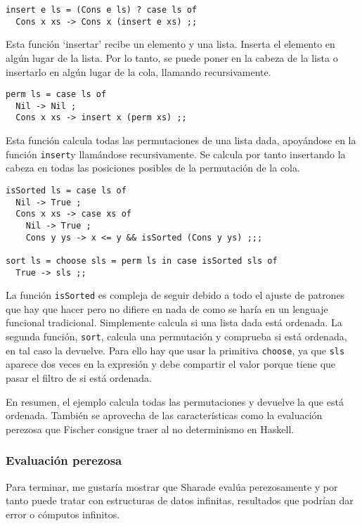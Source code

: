 \documentclass[class=article, crop=false]{standalone}
\begin{document}
\begin{verbatim}
insert e ls = (Cons e ls) ? case ls of
  Cons x xs -> Cons x (insert e xs) ;;
\end{verbatim}

Esta función `insertar' recibe un elemento y una lista. Inserta el elemento en algún lugar de
la lista. Por lo tanto, se puede poner en la cabeza de la lista o insertarlo en algún lugar
de la cola, llamando recursivamente.

\begin{verbatim}
perm ls = case ls of
  Nil -> Nil ;
  Cons x xs -> insert x (perm xs) ;;
\end{verbatim}

Esta función calcula todas las permutaciones de una lista dada, apoyándose en la función
\verb`insert`y llamándose recursivamente. Se calcula por tanto insertando la cabeza en todas
las posiciones posibles de la permutación de la cola.

\begin{verbatim}
isSorted ls = case ls of
  Nil -> True ;
  Cons x xs -> case xs of
    Nil -> True ;
    Cons y ys -> x <= y && isSorted (Cons y ys) ;;;

sort ls = choose sls = perm ls in case isSorted sls of
  True -> sls ;;
\end{verbatim}

La función \verb`isSorted` es compleja de seguir debido a todo el ajuste de patrones que hay
que hacer pero no difiere en nada de como se haría en un lenguaje funcional tradicional.
Simplemente calcula si una lista dada está ordenada. La segunda función, \verb`sort`, calcula
una permutación y comprueba si está ordenada, en tal caso la devuelve. Para ello hay que usar
la primitiva \verb`choose`, ya que \verb`sls` aparece dos veces en la expresión y debe
compartir el valor porque tiene que pasar el filtro de si está ordenada.

En resumen, el ejemplo calcula todas las permutaciones y devuelve la que está ordenada.
También se aprovecha de las características como la evaluación perezosa que Fischer consigue
traer al no determinismo en Haskell.

\subsubsection{Evaluación perezosa}

Para terminar, me gustaría mostrar que Sharade evalúa perezosamente y por tanto puede tratar
con estructuras de datos infinitas, resultados que podrían dar error o cómputos infinitos.
\end{document}
